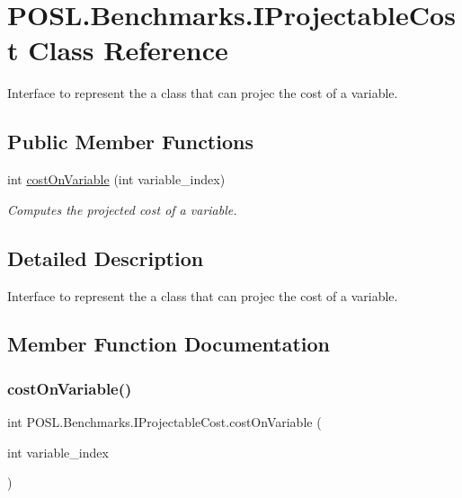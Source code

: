 \hypertarget{interfacePOSL_1_1Benchmarks_1_1IProjectableCost}{}\section{P\+O\+S\+L.\+Benchmarks.\+I\+Projectable\+Cost Class Reference}
\label{interfacePOSL_1_1Benchmarks_1_1IProjectableCost}


Interface to represent the a class that can projec the cost of a variable.  


\subsection*{Public Member Functions}
\begin{DoxyCompactItemize}
\item 
int \hyperlink{interfacePOSL_1_1Benchmarks_1_1IProjectableCost_a14a7025acdd7089e6fbc48a65f55487b}{cost\+On\+Variable} (int variable\+\_\+index)
\begin{DoxyCompactList}\small\item\em Computes the projected cost of a variable. \end{DoxyCompactList}\end{DoxyCompactItemize}


\subsection{Detailed Description}
Interface to represent the a class that can projec the cost of a variable. 

\subsection{Member Function Documentation}
\mbox{\label{interfacePOSL_1_1Benchmarks_1_1IProjectableCost_a14a7025acdd7089e6fbc48a65f55487b}} 
\subsubsection{\texorpdfstring{cost\+On\+Variable()}{costOnVariable()}}
{\footnotesize\ttfamily int P\+O\+S\+L.\+Benchmarks.\+I\+Projectable\+Cost.\+cost\+On\+Variable (\begin{DoxyParamCaption}\item[{int}]{variable\+\_\+index }\end{DoxyParamCaption})}



